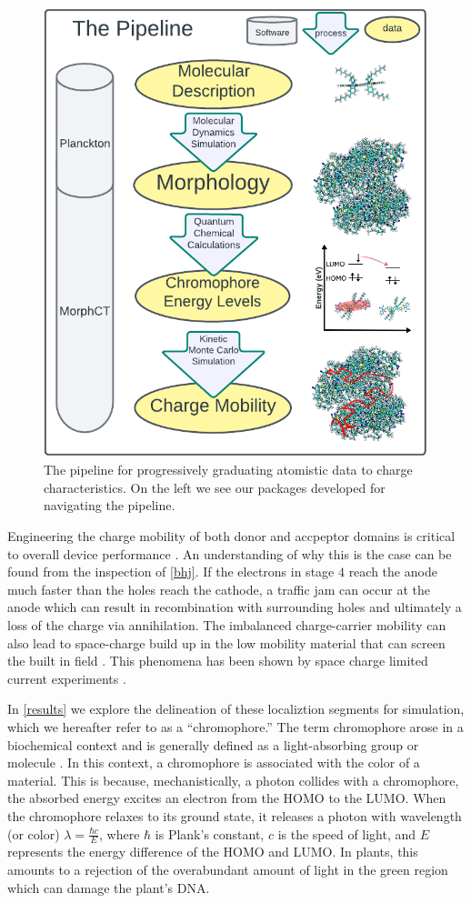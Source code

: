 \begin{figure}
  \center
  \includegraphics[width=0.9\linewidth]{figures/the-pipeline.png} 
    \caption{The pipeline for progressively graduating atomistic data to charge characteristics. On the left
    we see our packages developed for navigating the pipeline.}
  \label{pipeline}
\end{figure}

Engineering the charge mobility of both donor and accpeptor domains is critical
to overall device performance \cite{Wang2019e}.
An understanding of why this is the case can be found from the inspection of \autoref{bhj}.
If the electrons in stage $4$ reach the anode much faster than the holes reach the cathode, a traffic jam can
occur at the anode which can result in recombination with surrounding holes and ultimately a loss of the
charge via annihilation. 
The imbalanced charge-carrier mobility can also lead to space-charge build up in the 
low mobility material that can screen the built in field \cite{Bartelt2015}.
This phenomena has been shown by space charge limited current experiments \cite{Small2013}.

In \autoref{results} we explore the delineation of these localiztion segments for simulation,
which we hereafter refer to as a ``chromophore.'' 
The term chromophore arose in a biochemical context and is generally defined
as a light-absorbing group or molecule \cite{biochemistry}.
In this context, a chromophore is associated with the color of a material.
This is because, mechanistically, a photon collides with a chromophore, the absorbed energy
excites an electron from the HOMO to the
LUMO. When the chromophore relaxes to its
ground state, it releases a photon with wavelength (or color) $\lambda = \frac{\hbar c}{E}$,
where $\hbar$ is Plank's constant, $c$ is the speed of light, and $E$ represents the
energy difference of the HOMO and LUMO. In plants, this amounts to a rejection of the overabundant amount of
light in the green region which can damage the plant's DNA. 

